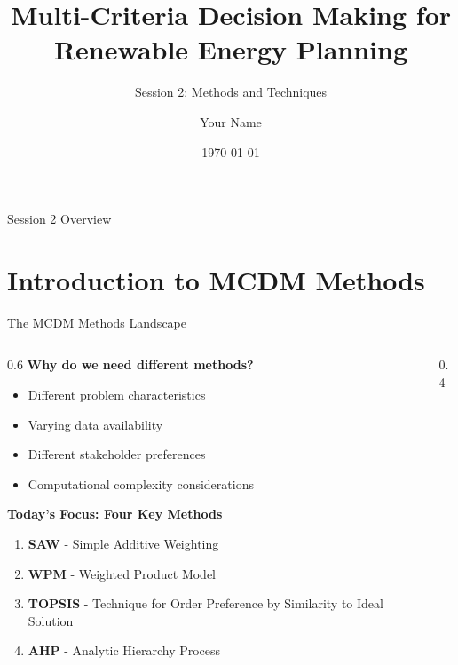 \documentclass[aspectratio=169]{beamer}
\title[MCDM Methods]{Multi-Criteria Decision Making for Renewable Energy Planning}
\subtitle{Session 2: Methods and Techniques}
\author{Your Name}
\institute{Your Institution}
\date{\today}
\begin{document}
\begin{frame}
\titlepage
\end{frame}

\begin{frame}{Session 2 Overview}
\tableofcontents
\end{frame}

\section{Introduction to MCDM Methods}

\begin{frame}{The MCDM Methods Landscape}
\begin{columns}
\begin{column}{0.6\textwidth}
\textbf{Why do we need different methods?}
\begin{itemize}
\item Different problem characteristics
\item Varying data availability
\item Different stakeholder preferences
\item Computational complexity considerations
\end{itemize}

\vspace{0.3cm}
\textbf{Today's Focus: Four Key Methods}
\begin{enumerate}
\item \textcolor{energygreen}{\textbf{SAW}} - Simple Additive Weighting
\item \textcolor{solarorange}{\textbf{WPM}} - Weighted Product Model
\item \textcolor{windblue}{\textbf{TOPSIS}} - Technique for Order Preference by Similarity to Ideal Solution
\item \textcolor{methodred}{\textbf{AHP}} - Analytic Hierarchy Process
\end{enumerate}
\end{column}
\begin{column}{0.4\textwidth}
\end{column}
\end{columns}
\end{frame}
\end{document}

